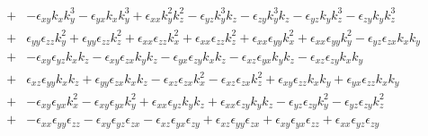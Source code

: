 \documentclass[12pt,a4paper,twoside,openright,BCOR10mm,headsepline,titlepage,abstracton,chapterprefix,final]{scrreprt}
\newcommand\wavenumber{k}
\newcommand\scalarpermittivity{\epsilon}
\begin{document}
\begin{eqnarray}
 \nonumber\\&+&
    - \scalarpermittivity_{xy} \wavenumber_x \wavenumber_y^3 - \scalarpermittivity_{yx} \wavenumber_x \wavenumber_y^3 
    +  \scalarpermittivity_{xx} \wavenumber_y^2 \wavenumber_z^2  
    - \scalarpermittivity_{yz} \wavenumber_y^3 \wavenumber_z - \scalarpermittivity_{zy} \wavenumber_y^3 \wavenumber_z  
    - \scalarpermittivity_{yz} \wavenumber_y \wavenumber_z^3 - \scalarpermittivity_{zy} \wavenumber_y \wavenumber_z^3  
 \nonumber\\[2ex]
 &+& 
       \scalarpermittivity_{yy} \scalarpermittivity_{zz} \wavenumber_y^2 
    +  \scalarpermittivity_{yy} \scalarpermittivity_{zz} \wavenumber_z^2 
    +  \scalarpermittivity_{xx} \scalarpermittivity_{zz} \wavenumber_x^2 + \scalarpermittivity_{xx} \scalarpermittivity_{zz} \wavenumber_z^2 + \scalarpermittivity_{xx} \scalarpermittivity_{yy} \wavenumber_x^2 + \scalarpermittivity_{xx} \scalarpermittivity_{yy} \wavenumber_y^2 
    -  \scalarpermittivity_{yz} \scalarpermittivity_{zx} \wavenumber_x \wavenumber_y 
 \nonumber\\&+&
    -  \scalarpermittivity_{xy} \scalarpermittivity_{yz} \wavenumber_x \wavenumber_z - \scalarpermittivity_{xy} \scalarpermittivity_{zx} \wavenumber_y \wavenumber_z  
    -  \scalarpermittivity_{yx} \scalarpermittivity_{zy} \wavenumber_x \wavenumber_z  
    -  \scalarpermittivity_{xz} \scalarpermittivity_{yx} \wavenumber_y \wavenumber_z - \scalarpermittivity_{xz} \scalarpermittivity_{zy} \wavenumber_x \wavenumber_y  
 \nonumber\\&+&
       \scalarpermittivity_{xz} \scalarpermittivity_{yy} \wavenumber_x \wavenumber_z + \scalarpermittivity_{yy} \scalarpermittivity_{zx} \wavenumber_x \wavenumber_z 
    -  \scalarpermittivity_{xz} \scalarpermittivity_{zx} \wavenumber_x^2 
    -  \scalarpermittivity_{xz} \scalarpermittivity_{zx} \wavenumber_z^2 
    +  \scalarpermittivity_{xy} \scalarpermittivity_{zz} \wavenumber_x \wavenumber_y + \scalarpermittivity_{yx} \scalarpermittivity_{zz} \wavenumber_x \wavenumber_y 
 \nonumber\\&+&
    -  \scalarpermittivity_{xy} \scalarpermittivity_{yx} \wavenumber_x^2 
    -  \scalarpermittivity_{xy} \scalarpermittivity_{yx} \wavenumber_y^2 
    +  \scalarpermittivity_{xx} \scalarpermittivity_{yz} \wavenumber_y \wavenumber_z + \scalarpermittivity_{xx} \scalarpermittivity_{zy} \wavenumber_y \wavenumber_z  
    -  \scalarpermittivity_{yz} \scalarpermittivity_{zy} \wavenumber_y^2 
    -  \scalarpermittivity_{yz} \scalarpermittivity_{zy} \wavenumber_z^2 
 \nonumber\\[2ex]
 &+& 
 -  \scalarpermittivity_{xx} \scalarpermittivity_{yy} \scalarpermittivity_{zz} 
 -  \scalarpermittivity_{xy} \scalarpermittivity_{yz} \scalarpermittivity_{zx}  
 -  \scalarpermittivity_{xz} \scalarpermittivity_{yx} \scalarpermittivity_{zy} 
 +  \scalarpermittivity_{xz} \scalarpermittivity_{yy} \scalarpermittivity_{zx} 
 +  \scalarpermittivity_{xy} \scalarpermittivity_{yx} \scalarpermittivity_{zz} 
 +  \scalarpermittivity_{xx} \scalarpermittivity_{yz} \scalarpermittivity_{zy} 
\end{eqnarray}
\end{document}

